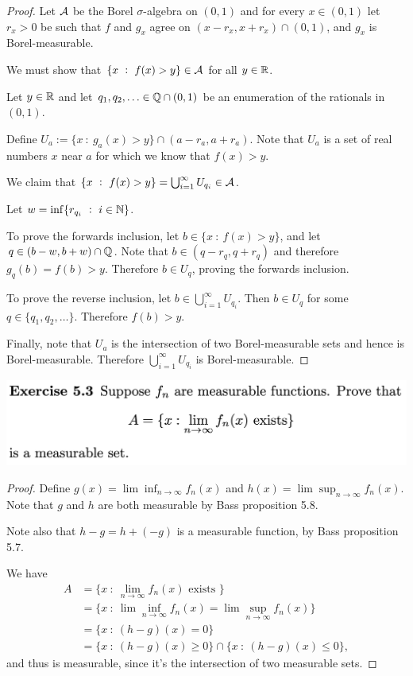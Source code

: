 \begin{proof}
  Let $\mathcal A$ be the Borel $\sigma$-algebra on $(0, 1)$ and for every $x \in (0, 1)$ let $r_x > 0$ be such
  that $f$ and $g_x$ agree on $(x - r_x, x + r_x) \cap (0, 1)$, and $g_x$ is Borel-measurable.

  We must show that $\{x ~:~ f(x) > y\} \in \mathcal A$ for all $y \in \mathbb{R}$.

  Let $y \in \mathbb{R}$ and let $q_1, q_2, \ldots \in \mathbb{Q} \cap (0, 1)$ be an enumeration of the rationals in $(0, 1)$.

  Define $U_{a} := \{x ~:~ g_{a}(x) > y\} \cap (a - r_{a}, a + r_{a})$. Note that $U_a$ is a set of real
  numbers $x$ near $a$ for which we know that $f(x) > y$.

  We claim that $\{x ~:~ f(x) > y\} = \bigcup_{i=1}^\infty U_{q_i} \in \mathcal A$.

  Let $w = \inf \{r_{q_i} ~:~ i \in \N \}$.

  To prove the forwards inclusion, let $b \in \{x ~:~ f(x) > y\}$, and let $q \in (b - w, b + w) \cap \mathbb{Q}$. Note
  that $b \in (q - r_q, q + r_q)$ and therefore $g_q(b) = f(b) > y$. Therefore $b \in U_q$, proving the
  forwards inclusion.

  To prove the reverse inclusion, let $b \in \bigcup_{i=1}^\infty U_{q_i}$. Then $b \in U_q$ for
  some $q \in \{q_1, q_2, \ldots\}$. Therefore $f(b) > y$.

  Finally, note that $U_a$ is the intersection of two Borel-measurable sets and hence is Borel-measurable.
  Therefore $\bigcup_{i=1}^\infty U_{q_i}$ is Borel-measurable.
\end{proof}

\newpage
\begin{mdframed}
\includegraphics[width=400pt]{img/analysis--berkeley-202a-hw06-aaf5.png}
\end{mdframed}

\begin{proof}
  Define $g(x) = \lim \inf_{n \to \infty} f_n(x)$ and $h(x) = \lim \sup_{n \to \infty} f_n(x)$. Note that $g$
  and $h$ are both measurable by Bass proposition 5.8.

  Note also that $h - g = h + (-g)$ is a measurable function, by Bass proposition 5.7.

  We have
  \begin{align*}
    A
    &= \{x ~:~ \lim_{n\to\infty} f_n(x) \text{~exists~}\} \\
    &= \{x ~:~ \lim \inf_{n \to \infty} f_n(x) = \lim \sup_{n \to \infty} f_n(x) \} \\
    &= \{x ~:~ (h - g)(x) = 0\} \\
    &= \{x ~:~ (h - g)(x) \geq 0\} \cap \{x ~:~ (h - g)(x) \leq 0\},
  \end{align*}
  and thus is measurable, since it's the intersection of two measurable sets.
\end{proof}



